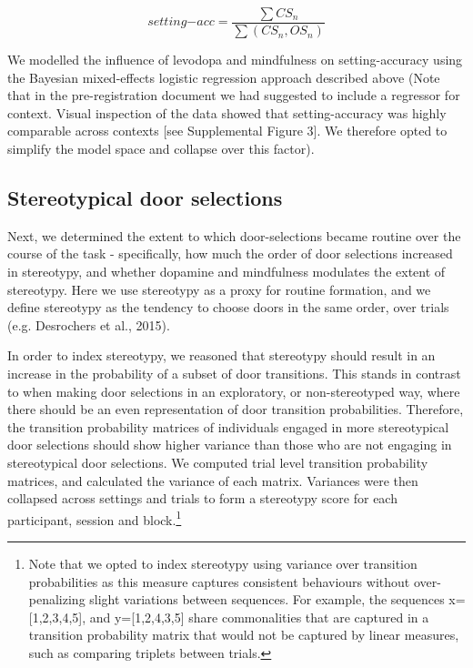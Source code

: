 \documentclass[
  man]{apa6}
\begin{document}
\[
setting\mathrm{-}acc = \frac{\sum{CS_{n}}}{\sum{(CS_{n}, OS_{n})}}
\]

We modelled the influence of levodopa and mindfulness on setting-accuracy using the Bayesian mixed-effects logistic regression approach described above (Note that in the pre-registration document we had suggested to include a regressor for context. Visual inspection of the data showed that setting-accuracy was highly comparable across contexts {[}see Supplemental Figure 3{]}. We therefore opted to simplify the model space and collapse over this factor).

\hypertarget{stereotypical-door-selections}{%
\subsection{Stereotypical door selections}\label{stereotypical-door-selections}}

\label{sec:Stereotypical door selections}

Next, we determined the extent to which door-selections became routine over the course of the task - specifically, how much the order of door selections increased in stereotypy, and whether dopamine and mindfulness modulates the extent of stereotypy. Here we use stereotypy as a proxy for routine formation, and we define stereotypy as the tendency to choose doors in the same order, over trials (e.g. Desrochers et al., 2015).

In order to index stereotypy, we reasoned that stereotypy should result in an increase in the probability of a subset of door transitions. This stands in contrast to when making door selections in an exploratory, or non-stereotyped way, where there should be an even representation of door transition probabilities. Therefore, the transition probability matrices of individuals engaged in more stereotypical door selections should show higher variance than those who are not engaging in stereotypical door selections. We computed trial level transition probability matrices, and calculated the variance of each matrix. Variances were then collapsed across settings and trials to form a stereotypy score for each participant, session and block.\footnote{Note that we opted to index stereotypy using variance over transition probabilities as this measure captures consistent behaviours without over-penalizing slight variations between sequences. For example, the sequences x={[}1,2,3,4,5{]}, and y={[}1,2,4,3,5{]} share commonalities that are captured in a transition probability matrix that would not be captured by linear measures, such as comparing triplets between trials.}
\end{document}

